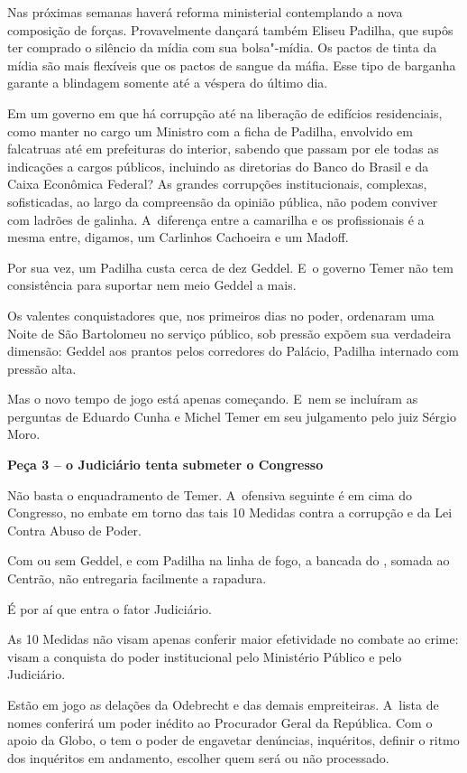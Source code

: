    

Nas próximas semanas haverá reforma ministerial contemplando a nova
composição de forças. Provavelmente dançará também Eliseu Padilha, que
supôs ter comprado o silêncio da mídia com sua bolsa"-mídia. Os pactos de
tinta da mídia são mais flexíveis que os pactos de sangue da máfia. Esse
tipo de barganha garante a blindagem somente até a véspera do último
dia.

Em um governo em que há corrupção até na liberação de edifícios
residenciais, como manter no cargo um Ministro com a ficha de Padilha,
envolvido em falcatruas até em prefeituras do interior, sabendo que
passam por ele todas as indicações a cargos públicos, incluindo as
diretorias do Banco do Brasil e da Caixa Econômica Federal? As grandes
corrupções institucionais, complexas, sofisticadas, ao largo da
compreensão da opinião pública, não podem conviver com ladrões de
galinha. A~diferença entre a camarilha e os profissionais é a mesma
entre, digamos, um Carlinhos Cachoeira e um Madoff.

Por sua vez, um Padilha custa cerca de dez Geddel. E~o governo Temer não
tem consistência para suportar nem meio Geddel a mais.

Os valentes conquistadores que, nos primeiros dias no poder, ordenaram
uma Noite de São Bartolomeu no serviço público, sob pressão expõem sua
verdadeira dimensão: Geddel aos prantos pelos corredores do Palácio,
Padilha internado com pressão alta.

Mas o novo tempo de jogo está apenas começando. E~nem se incluíram as
perguntas de Eduardo Cunha e Michel Temer em seu julgamento pelo juiz
Sérgio Moro.

\textbf{Peça 3 -- o Judiciário tenta submeter o Congresso}

Não basta o enquadramento de Temer. A~ofensiva seguinte é em cima do
Congresso, no embate em torno das tais 10 Medidas contra a corrupção e
da Lei Contra Abuso de Poder.

Com ou sem Geddel, e com Padilha na linha de fogo, a bancada do ,
somada ao Centrão, não entregaria facilmente a rapadura.

É por aí que entra o fator Judiciário.

As 10 Medidas não visam apenas conferir maior efetividade no combate ao
crime: visam a conquista do poder institucional pelo Ministério Público
e pelo Judiciário.

Estão em jogo as delações da Odebrecht e das demais empreiteiras. A~lista de nomes conferirá um poder inédito ao Procurador Geral da
República. Com o apoio da Globo, o  tem o poder de engavetar
denúncias, inquéritos, definir o ritmo dos inquéritos em andamento,
escolher quem será ou não processado.

